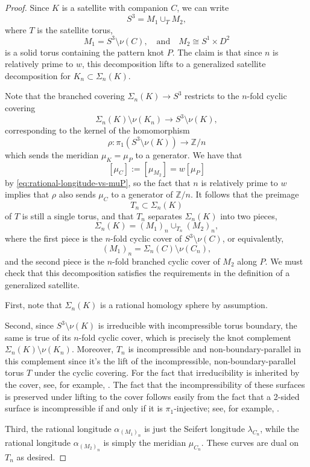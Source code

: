 \documentclass[11pt]{amsart}
\numberwithin{equation}{section}
\numberwithin{theorem}{section}
\theoremstyle{definition}
\newcommand{\Z}{\mathbb{Z}}
\begin{document}
\begin{proof}
Since $K$ is a satellite with companion $C$, we can write \[S^3 = M_1\cup_T M_2,\] where $T$ is the satellite torus, \[M_1 = S^3\setminus \nu(C), \quad \textrm{and}\quad M_2\cong S^1\times D^2\] is a solid torus containing the pattern knot $P$. The claim is that since $n$ is relatively prime to $w$, this decomposition lifts to a generalized satellite decomposition for $K_n \subset\Sigma_n(K)$. 

Note that the branched covering $\Sigma_n(K)\to S^3$ restricts to the $n$-fold cyclic covering \[\Sigma_n(K)\setminus \nu(K_n)\to S^3\setminus \nu(K),\] corresponding to the kernel of the homomorphism \[\rho:\pi_1(S^3\setminus \nu(K)) \to \Z/n\] which sends the meridian $\mu_K=\mu_P$ to a generator. We have that \[[\mu_C] :=[\mu_{M_2}]= w[\mu_P]\] by \eqref{eq:rational-longitude-vs-muP}, so the fact that $n$ is relatively prime to $w$ implies that $\rho$ also sends $\mu_C$ to a generator of $\Z/n$. It follows that the preimage \[T_n\subset \Sigma_n(K)\] of $T$ is still a single torus, and that $T_n$ separates $\Sigma_n(K)$ into two pieces, \[\Sigma_n(K) = (M_1)_n \cup_{T_n} (M_2)_n,\] where the first piece is the $n$-fold cyclic cover of $S^3\setminus \nu(C)$, or equivalently, \[(M_1)_n = \Sigma_n(C)\setminus \nu(C_n),\] and the second piece is the $n$-fold branched cyclic cover of $M_2$ along $P$. We must check that this decomposition satisfies the requirements in the definition of a generalized satellite. 

First, note that  $\Sigma_n(K)$ is a rational homology sphere by assumption. 

Second, since $S^3\setminus \nu(K)$ is irreducible with incompressible torus boundary, the same is true of its $n$-fold cyclic cover, which is precisely the knot complement $\Sigma_n(K)\setminus \nu(K_n)$.  Moreover, $T_n$ is incompressible and non-boundary-parallel in this complement since it's the lift of the incompressible, non-boundary-parallel torus $T$ under the cyclic covering. For the fact that irreducibility is inherited by the cover, see, for example, \cite[Theorem 3.15]{hatcher-3mfld}. The fact that the incompressibility of these surfaces is preserved under lifting to the cover follows easily from the fact that a 2-sided surface is incompressible if and only if it is $\pi_1$-injective; see, for example, \cite[Corollary 3.3]{hatcher-3mfld}.

Third, the rational longitude $\alpha_{(M_1)_n}$ is just the Seifert longitude $\lambda_{C_n}$, while the rational longitude $\alpha_{(M_2)_n}$ is simply the meridian $\mu_{C_n}$. These curves are dual on $T_n$ as desired.


\end{proof}
\end{document}
